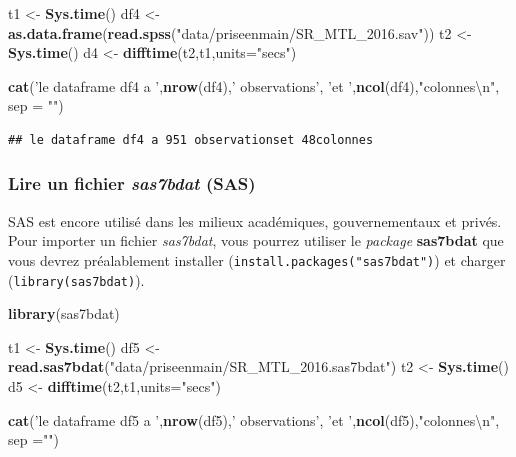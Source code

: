 \documentclass[
  11pt,
  french,
]{book}
\makeatletter
\newenvironment{Shaded}{\begin{snugshade}}{\end{snugshade}}
\newcommand{\CharTok}[1]{\textcolor[rgb]{0.31,0.60,0.02}{#1}}
\newcommand{\DataTypeTok}[1]{\textcolor[rgb]{0.13,0.29,0.53}{#1}}
\newcommand{\KeywordTok}[1]{\textcolor[rgb]{0.13,0.29,0.53}{\textbf{#1}}}
\newcommand{\NormalTok}[1]{#1}
\newcommand{\StringTok}[1]{\textcolor[rgb]{0.31,0.60,0.02}{#1}}
\newenvironment{kframe}{%
\medskip{}
\setlength{\fboxsep}{.8em}
 \def\at@end@of@kframe{}%
 \ifinner\ifhmode%
  \def\at@end@of@kframe{\end{minipage}}%
  \begin{minipage}{\columnwidth}%
 \fi\fi%
 \def\FrameCommand##1{\hskip\@totalleftmargin \hskip-\fboxsep
 \colorbox{shadecolor}{##1}\hskip-\fboxsep
     \hskip-\linewidth \hskip-\@totalleftmargin \hskip\columnwidth}%
 \MakeFramed {\advance\hsize-\width
   \@totalleftmargin\z@ \linewidth\hsize
   \@setminipage}}%
 {\par\unskip\endMakeFramed%
 \at@end@of@kframe}
\renewenvironment{Shaded}{\begin{kframe}}{\end{kframe}}
\makeatother
\begin{document}
\begin{Shaded}
\begin{Highlighting}[]
\NormalTok{t1 <-}\StringTok{ }\KeywordTok{Sys.time}\NormalTok{()}
\NormalTok{df4 <-}\StringTok{ }\KeywordTok{as.data.frame}\NormalTok{(}\KeywordTok{read.spss}\NormalTok{(}\StringTok{"data/priseenmain/SR_MTL_2016.sav"}\NormalTok{))}
\NormalTok{t2 <-}\StringTok{ }\KeywordTok{Sys.time}\NormalTok{()}
\NormalTok{d4 <-}\StringTok{ }\KeywordTok{difftime}\NormalTok{(t2,t1,}\DataTypeTok{units=}\StringTok{"secs"}\NormalTok{)}

\KeywordTok{cat}\NormalTok{(}\StringTok{'le dataframe df4 a '}\NormalTok{,}\KeywordTok{nrow}\NormalTok{(df4),}\StringTok{' observations'}\NormalTok{,}
    \StringTok{'et '}\NormalTok{,}\KeywordTok{ncol}\NormalTok{(df4),}\StringTok{"colonnes}\CharTok{\textbackslash{}n}\StringTok{"}\NormalTok{, }\DataTypeTok{sep =} \StringTok{""}\NormalTok{)}
\end{Highlighting}
\end{Shaded}

\begin{verbatim}
## le dataframe df4 a 951 observationset 48colonnes
\end{verbatim}

\hypertarget{sect01415}{%
\subsubsection{\texorpdfstring{Lire un fichier \emph{sas7bdat} (SAS)}{Lire un fichier sas7bdat (SAS)}}\label{sect01415}}

SAS est encore utilisé dans les milieux académiques, gouvernementaux et privés. Pour importer un fichier \emph{sas7bdat}, vous pourrez utiliser le \emph{package} \textbf{sas7bdat} que vous devrez préalablement installer (\texttt{install.packages("sas7bdat")}) et charger (\texttt{library(sas7bdat)}).

\begin{Shaded}
\begin{Highlighting}[]
\KeywordTok{library}\NormalTok{(sas7bdat)}

\NormalTok{t1 <-}\StringTok{ }\KeywordTok{Sys.time}\NormalTok{()}
\NormalTok{df5 <-}\StringTok{ }\KeywordTok{read.sas7bdat}\NormalTok{(}\StringTok{"data/priseenmain/SR_MTL_2016.sas7bdat"}\NormalTok{)}
\NormalTok{t2 <-}\StringTok{ }\KeywordTok{Sys.time}\NormalTok{()}
\NormalTok{d5 <-}\StringTok{ }\KeywordTok{difftime}\NormalTok{(t2,t1,}\DataTypeTok{units=}\StringTok{"secs"}\NormalTok{)}

\KeywordTok{cat}\NormalTok{(}\StringTok{'le dataframe df5 a '}\NormalTok{,}\KeywordTok{nrow}\NormalTok{(df5),}\StringTok{' observations'}\NormalTok{,}
    \StringTok{'et '}\NormalTok{,}\KeywordTok{ncol}\NormalTok{(df5),}\StringTok{"colonnes}\CharTok{\textbackslash{}n}\StringTok{"}\NormalTok{, }\DataTypeTok{sep =}\StringTok{""}\NormalTok{)}
\end{Highlighting}
\end{Shaded}
\end{document}
